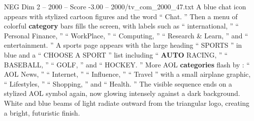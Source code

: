 \begin{textsample}{NEG Dim 2 – 2000 – Score -3.00 – 2000/tv\_com\_2000\_47.txt}
A blue chat icon appears with stylized cartoon figures and the word “ Chat. ” Then a menu of colorful \textbf{category} bars fills the screen, with labels such as “ international, ” “ Personal Finance, ” “ WorkPlace, ” “ Computing, ” “ Research \& Learn, ” and “ entertainment. ” A sports page appears with the large heading “ SPORTS ” in blue and a “ CHOOSE A SPORT ” list including “ \textbf{AUTO} RACING, ” “ BASEBALL, ” “ GOLF, ” and “ HOCKEY. ” More AOL \textbf{categories} flash by : “ AOL News, ” “ Internet, ” “ Influence, ” “ Travel ” with a small airplane graphic, “ Lifestyles, ” “ Shopping, ” and “ Health. ” The visible sequence ends on a stylized AOL symbol again, now glowing intensely against a dark background.
White and blue beams of light radiate outward from the triangular logo, creating a bright, futuristic finish.

\end{textsample}
